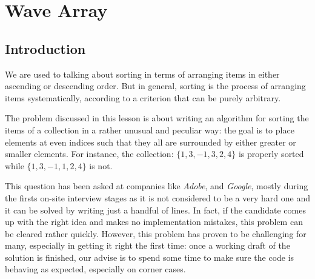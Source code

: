 %

\chapter{Wave Array}
\label{ch:wave_array}
\section*{Introduction}
We are used to talking about sorting in terms of arranging items in either ascending or descending order.
But in general, sorting is the process of arranging items systematically, according to a criterion that can be purely arbitrary.

The problem discussed in this lesson is about writing an algorithm for sorting the items of a collection in a rather unusual and peculiar way: the goal is to place elements at even indices such that they all are surrounded by either greater or smaller elements. For instance, the collection: $\{1,3,-1,3,2,4\}$ is properly sorted while $\{1,3,-1,1,2,4\}$ is not.

This question has been asked at companies like \textit{Adobe}, and \textit{Google}, mostly during the firsts on-site interview stages as it is not considered to be a very hard one and it can be solved by writing just a handful of lines.
In fact, if the candidate comes up with the right idea and makes no implementation mistakes, this problem can be cleared rather quickly.
However, this problem has proven to be challenging for many, especially in getting it right the first time: once a working draft of the solution is finished, our advise is to spend some time to make sure the code is behaving as expected, especially on corner cases.

